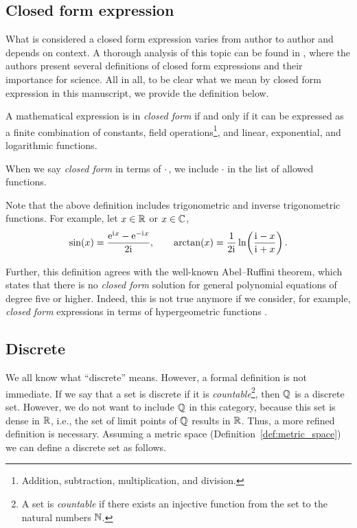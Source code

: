 \subsection{Closed form expression}
What is considered a closed form expression varies from author to author and depends on context.
%
A thorough analysis of this topic can be found in \cite{borwein2013closed}, where the authors present several definitions of closed form expressions and their importance for science.
%
All in all, to be clear what we mean by closed form expression in this manuscript, we provide the definition below.
\begin{definition} \label{def:closed_form}
    A mathematical expression is in \textit{closed form} if and only if it can be expressed as a finite combination of constants, field operations\footnote{Addition, subtraction, multiplication, and division.}, and linear, exponential, and logarithmic functions.
    
    When we say \textit{closed form} in terms of $\cdot$\,, we include $\cdot$ in the list of allowed functions.
\end{definition}

Note that the above definition includes trigonometric and inverse trigonometric functions. For example, let $x\in{\mathbb R}$ or $x\in{\mathbb C}$,
\begin{align*}
    \sin(x) = \frac{\mathrm{e}^{\mathrm{i}\mkern1mu x}-\mathrm{e}^{-\mathrm{i}\mkern1mu x}}{2\mathrm{i}\mkern1mu}, \qquad \arctan(x) = \frac{1}{2\mathrm{i}\mkern1mu} \ln\!\left(\frac{\mathrm{i}\mkern1mu-x}{\mathrm{i}\mkern1mu+x}\right).
\end{align*}

Further, this definition agrees with the well-known Abel–Ruffini theorem, which states that there is no \textit{closed form} solution for general polynomial equations of degree five or higher.
%
Indeed, this is not true anymore if we consider, for example, \textit{closed form} expressions in terms of hypergeometric functions \cite{chow1999closed}.

\subsection{Discrete}

We all know what ``discrete'' means. However, a formal definition is not immediate. If we say that a set is discrete if it is \textit{countable}\footnote{A set is \textit{countable} if there exists an injective function from the set to the natural numbers ${\mathbb N}$.}, then ${\mathbb Q}$ is a discrete set. However, we do not want to include ${\mathbb Q}$ in this category, because this set is dense in ${\mathbb R}$, i.e., the set of limit points of ${\mathbb Q}$ results in ${\mathbb R}$.
Thus, a more refined definition is necessary. Assuming a metric space (Definition~\ref{def:metric_space}) we can define a discrete set as follows.

